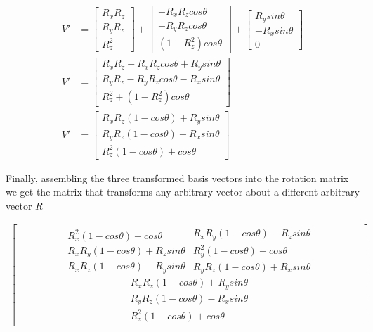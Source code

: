 \documentclass{article}
\begin{document}
    \begin{align}
        V' &= 
        \begin{bmatrix} R_xR_z \\ R_yR_z \\ R_z^2 \end{bmatrix} +  
        \begin{bmatrix} -R_xR_zcos\theta \\  -R_yR_zcos\theta \\ (1-R_z^2)cos\theta \end{bmatrix} +
        \begin{bmatrix} R_ysin\theta \\ -R_xsin\theta \\ 0 \end{bmatrix} \\
        V' &= 
        \begin{bmatrix}
            R_xR_z - R_xR_zcos\theta + R_ysin\theta \\ 
            R_yR_z - R_yR_zcos\theta - R_xsin\theta \\ 
            R_z^2  + (1-R_z^2)cos\theta   
        \end{bmatrix} \\
        V' &= 
        \begin{bmatrix}
            R_xR_z(1 - cos\theta) + R_ysin\theta \\ 
            R_yR_z(1 - cos\theta) - R_xsin\theta \\ 
            R_z^2(1 - cos\theta) + cos\theta  
        \end{bmatrix} \label{eq:zaxisAfterRotation}
    \end{align}


    \noindent Finally, assembling the three transformed basis vectors into the rotation matrix we get the matrix that transforms any arbitrary vector about a different arbitrary vector $R$
    
    \begin{align}
        \begin{bmatrix}
            \begin{matrix}
                R_x^2(1 - cos\theta) + cos\theta \\ 
                R_xR_y(1 - cos\theta) + R_zsin\theta \\ 
                R_xR_z(1 - cos\theta) - R_ysin\theta  
            \end{matrix}
            \begin{matrix}
                R_xR_y(1 - cos\theta) - R_zsin\theta \\ 
                R_y^2(1 - cos\theta) + cos\theta \\ 
                R_yR_z(1 - cos\theta) + R_xsin\theta  
            \end{matrix}
            \begin{matrix}
                R_xR_z(1 - cos\theta) + R_ysin\theta \\ 
                R_yR_z(1 - cos\theta) - R_xsin\theta \\ 
                R_z^2(1 - cos\theta) + cos\theta  
            \end{matrix}
        \end{bmatrix}
    \end{align}
\end{document}
